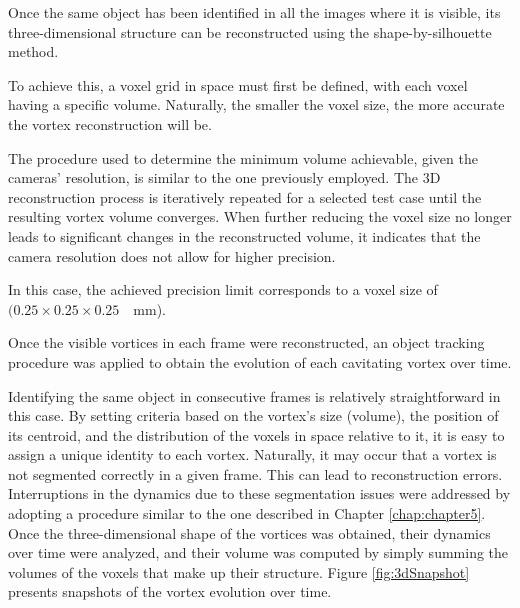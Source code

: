 Once the same object has been identified in all the images where it is visible, its three-dimensional structure can be reconstructed using the shape-by-silhouette method.  

To achieve this, a voxel grid in space must first be defined, with each voxel having a specific volume. Naturally, the smaller the voxel size, the more accurate the vortex reconstruction will be.  

The procedure used to determine the minimum volume achievable, given the cameras' resolution, is similar to the one previously employed. The 3D reconstruction process is iteratively repeated for a selected test case until the resulting vortex volume converges. When further reducing the voxel size no longer leads to significant changes in the reconstructed volume, it indicates that the camera resolution does not allow for higher precision.  

In this case, the achieved precision limit corresponds to a voxel size of $( 0.25 \times 0.25 \times 0.25 \quad \text{mm} $).

Once the visible vortices in each frame were reconstructed, an object tracking procedure was applied to obtain the evolution of each cavitating vortex over time. 

Identifying the same object in consecutive frames is relatively straightforward in this case. By setting criteria based on the vortex's size (volume), the position of its centroid, and the distribution of the voxels in space relative to it, it is easy to assign a unique identity to each vortex.
Naturally, it may occur that a vortex is not segmented correctly in a given frame. This can lead to reconstruction errors. Interruptions in the dynamics due to these segmentation issues were addressed by adopting a procedure similar to the one described in Chapter \ref{chap:chapter5}.
Once the three-dimensional shape of the vortices was obtained, their dynamics over time were analyzed, and their volume was computed by simply summing the volumes of the voxels that make up their structure. Figure \ref{fig:3dSnapshot} presents snapshots of the vortex evolution over time.

